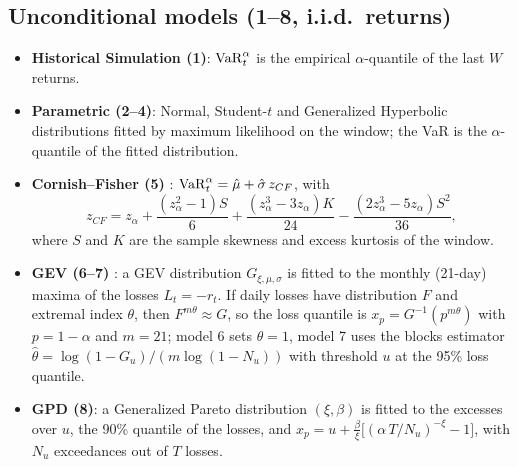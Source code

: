 \subsection{Unconditional models (1--8, i.i.d.\ returns)}
\begin{itemize}
  \item \textbf{Historical Simulation (1)}: $\mathrm{VaR}_t^\alpha$ is the empirical $\alpha$-quantile of the last $W$ returns.
  \item \textbf{Parametric (2--4)}: Normal, Student-$t$ and Generalized Hyperbolic \citep{barndorff1977} distributions
        fitted by maximum likelihood on the window; the VaR is the $\alpha$-quantile of the fitted distribution.
  \item \textbf{Cornish--Fisher (5)} \citep{cornish1938}: $\mathrm{VaR}_t^\alpha = \hat\mu + \hat\sigma\, z_{CF}$, with
  \begin{equation}\label{eq:cf}
    z_{CF} = z_\alpha + \frac{(z_\alpha^2-1)S}{6} + \frac{(z_\alpha^3-3z_\alpha)K}{24} - \frac{(2z_\alpha^3-5z_\alpha)S^2}{36},
  \end{equation}
  where $S$ and $K$ are the sample skewness and excess kurtosis of the window.
  \item \textbf{GEV (6--7)} \citep{embrechts1997}: a GEV distribution $G_{\xi,\mu,\sigma}$ is fitted to the monthly
        (21-day) maxima of the losses $L_t=-r_t$. If daily losses have distribution $F$ and extremal index $\theta$,
        then $F^{m\theta} \approx G$, so the loss quantile is $x_p = G^{-1}(p^{m\theta})$ with $p = 1-\alpha$ and
        $m=21$; model 6 sets $\theta = 1$, model 7 uses the blocks estimator
        $\hat\theta = \log(1-G_u)/(m\log(1-N_u))$ with threshold $u$ at the 95\% loss quantile.
  \item \textbf{GPD (8)}: a Generalized Pareto distribution $(\xi,\beta)$ is fitted to the excesses over $u$, the 90\%
        quantile of the losses, and
        $x_p = u + \frac{\beta}{\xi}\big[(\alpha\, T/N_u)^{-\xi}-1\big]$, with $N_u$ exceedances out of $T$ losses.
\end{itemize}
